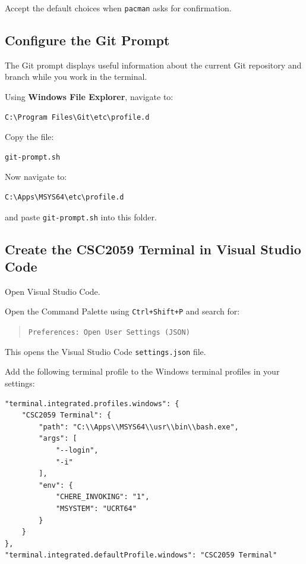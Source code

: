\documentclass{csc2059practical}
\begin{document}
Accept the default choices when \texttt{pacman} asks for confirmation.

\subsection{Configure the Git Prompt}

The Git prompt displays useful information about the current Git repository and branch while you work in the terminal.

Using \textbf{Windows File Explorer}, navigate to:

\begin{verbatim}
C:\Program Files\Git\etc\profile.d
\end{verbatim}

Copy the file:

\begin{verbatim}
git-prompt.sh
\end{verbatim}

Now navigate to:

\begin{verbatim}
C:\Apps\MSYS64\etc\profile.d
\end{verbatim}

and paste \texttt{git-prompt.sh} into this folder.

\subsection{Create the CSC2059 Terminal in Visual Studio Code}

Open Visual Studio Code.

Open the Command Palette using \texttt{Ctrl+Shift+P} and search for:

\begin{quote}
\texttt{Preferences: Open User Settings (JSON)}
\end{quote}

This opens the Visual Studio Code \texttt{settings.json} file.

Add the following terminal profile to the Windows terminal profiles in your settings:

\begin{verbatim}
"terminal.integrated.profiles.windows": {
    "CSC2059 Terminal": {
        "path": "C:\\Apps\\MSYS64\\usr\\bin\\bash.exe",
        "args": [
            "--login",
            "-i"
        ],
        "env": {
            "CHERE_INVOKING": "1",
            "MSYSTEM": "UCRT64"
        }
    }
},
"terminal.integrated.defaultProfile.windows": "CSC2059 Terminal"
\end{verbatim}
\end{document}
